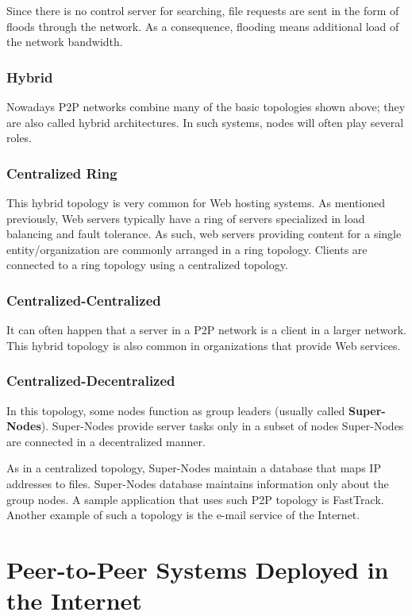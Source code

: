 Since there is no control server for searching, file requests are sent in the
form of floods through the network. As a consequence, flooding means additional
load of the network bandwidth.

\subsubsection{Hybrid}

Nowadays P2P networks combine many of the basic topologies shown above; they
are also called hybrid architectures. In such systems, nodes will often play
several roles.

\subsubsection{Centralized Ring}

This hybrid topology is very common for Web hosting systems. As mentioned
previously, Web servers typically have a ring of servers specialized in load
balancing and fault tolerance. As such, web servers providing content for a
single entity/organization are commonly arranged in a ring topology.  Clients
are connected to a ring topology using a centralized topology.

\subsubsection{Centralized-Centralized}

It can often happen that a server in a P2P network is a client in a larger
network. This hybrid topology is also common in organizations that provide
Web services.

\subsubsection{Centralized-Decentralized}

In this topology, some nodes function as group leaders (usually called
\textbf{Super-Nodes}). Super-Nodes provide server tasks only in a subset of
nodes  Super-Nodes are connected in a decentralized manner.

As in a centralized topology, Super-Nodes maintain a database that maps IP
addresses to files. Super-Nodes database maintains information only about
the group nodes. A sample application that uses such P2P topology is
FastTrack. Another example of such a topology is the e-mail
service of the Internet.

\section{Peer-to-Peer Systems Deployed in the Internet}
\label{sec:p2p-systems:p2p-internet}

